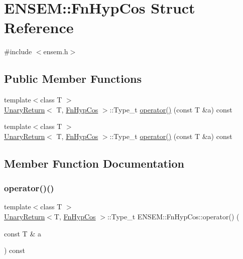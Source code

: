 \hypertarget{structENSEM_1_1FnHypCos}{}\section{E\+N\+S\+EM\+:\+:Fn\+Hyp\+Cos Struct Reference}
\label{structENSEM_1_1FnHypCos}


{\ttfamily \#include $<$ensem.\+h$>$}

\subsection*{Public Member Functions}
\begin{DoxyCompactItemize}
\item 
{\footnotesize template$<$class T $>$ }\\\mbox{\hyperlink{structENSEM_1_1UnaryReturn}{Unary\+Return}}$<$ T, \mbox{\hyperlink{structENSEM_1_1FnHypCos}{Fn\+Hyp\+Cos}} $>$\+::Type\+\_\+t \mbox{\hyperlink{structENSEM_1_1FnHypCos_abc3e4d24871bdf77186ed9f57adfcf1c}{operator()}} (const T \&a) const
\item 
{\footnotesize template$<$class T $>$ }\\\mbox{\hyperlink{structENSEM_1_1UnaryReturn}{Unary\+Return}}$<$ T, \mbox{\hyperlink{structENSEM_1_1FnHypCos}{Fn\+Hyp\+Cos}} $>$\+::Type\+\_\+t \mbox{\hyperlink{structENSEM_1_1FnHypCos_abc3e4d24871bdf77186ed9f57adfcf1c}{operator()}} (const T \&a) const
\end{DoxyCompactItemize}


\subsection{Member Function Documentation}
\mbox{\label{structENSEM_1_1FnHypCos_abc3e4d24871bdf77186ed9f57adfcf1c}} 
\subsubsection{\texorpdfstring{operator()()}{operator()()}\hspace{0.1cm}{\footnotesize\ttfamily [1/2]}}
{\footnotesize\ttfamily template$<$class T $>$ \\
\mbox{\hyperlink{structENSEM_1_1UnaryReturn}{Unary\+Return}}$<$T, \mbox{\hyperlink{structENSEM_1_1FnHypCos}{Fn\+Hyp\+Cos}} $>$\+::Type\+\_\+t E\+N\+S\+E\+M\+::\+Fn\+Hyp\+Cos\+::operator() (\begin{DoxyParamCaption}\item[{const T \&}]{a }\end{DoxyParamCaption}) const\hspace{0.3cm}{\ttfamily [inline]}}

